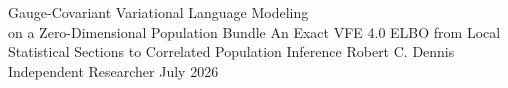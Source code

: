 \documentclass[11pt,letterpaper]{report}
\begin{document}
\makereporttitle
  {Gauge-Covariant Variational Language Modeling\\on a Zero-Dimensional Population Bundle}
  {An Exact VFE 4.0 ELBO from Local Statistical Sections to Correlated Population Inference}
  {Robert C. Dennis}
  {Independent Researcher}
  {July 2026}

\tableofcontents
\listoffigures
\listoftables
\clearpage
{}









\appendix




\end{document}
